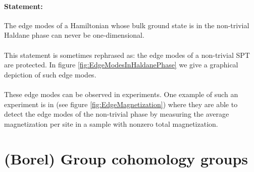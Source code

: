 \paragraph{Statement:}The edge modes of a Hamiltonian whose bulk ground state is in the non-trivial Haldane phase can never be one-dimensional.
\\\\
This statement is sometimes rephrased as: the edge modes of a non-trivial SPT are protected. In figure \ref{fig:EdgeModesInHaldanePhase} we give a graphical depiction of such edge modes.
\\\\
These edge modes can be observed in experiments. One example of such an experiment is in \cite{sompet2022realizing} (see figure \ref{fig:EdgeMagnetization}) where they are able to detect the edge modes of the non-trivial phase by measuring the average magnetization per site in a sample with nonzero total magnetization. 
\section{(Borel) Group cohomology groups}
